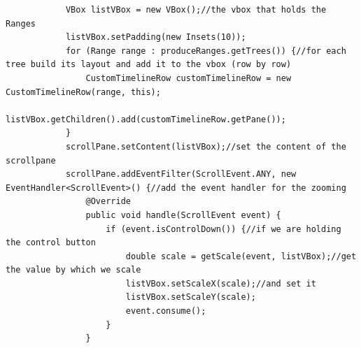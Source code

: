\begin{lstlisting}
            VBox listVBox = new VBox();//the vbox that holds the Ranges
            listVBox.setPadding(new Insets(10));
            for (Range range : produceRanges.getTrees()) {//for each tree build its layout and add it to the vbox (row by row)
                CustomTimelineRow customTimelineRow = new CustomTimelineRow(range, this);
                listVBox.getChildren().add(customTimelineRow.getPane());
            }
            scrollPane.setContent(listVBox);//set the content of the scrollpane
            scrollPane.addEventFilter(ScrollEvent.ANY, new EventHandler<ScrollEvent>() {//add the event handler for the zooming
                @Override
                public void handle(ScrollEvent event) {
                    if (event.isControlDown()) {//if we are holding the control button
                        double scale = getScale(event, listVBox);//get the value by which we scale
                        listVBox.setScaleX(scale);//and set it
                        listVBox.setScaleY(scale);
                        event.consume();
                    }
                }


\end{lstlisting}
